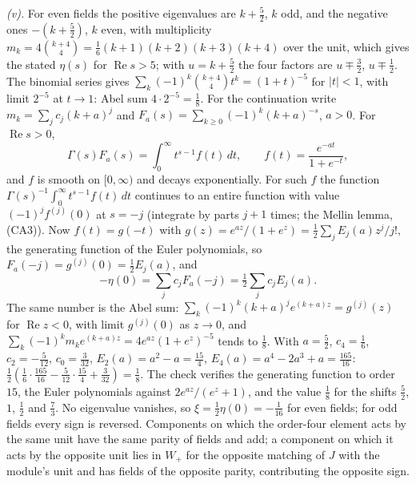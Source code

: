 \emph{(v).} For even fields the positive eigenvalues are $k + \tfrac52$, $k$ odd, and the negative ones $-(k + \tfrac52)$, $k$ even, with multiplicity $m_{k} = 4\binom{k+4}{4} = \tfrac16(k+1)(k+2)(k+3)(k+4)$ over the unit, which gives the stated $\eta(s)$ for $\operatorname{Re}s > 5$; with $u = k + \tfrac52$ the four factors are $u \mp \tfrac32$, $u \mp \tfrac12$. The binomial series gives $\sum_{k}(-1)^{k}\binom{k+4}{4}t^{k} = (1 + t)^{-5}$ for $|t| < 1$, with limit $2^{-5}$ at $t \to 1$: Abel sum $4 \cdot 2^{-5} = \tfrac18$. For the continuation write $m_{k} = \sum_{j}c_{j}(k + a)^{j}$ and $F_{a}(s) = \sum_{k \ge 0}(-1)^{k}(k + a)^{-s}$, $a > 0$. For $\operatorname{Re}s > 0$,
\[
\Gamma(s)F_{a}(s) = \int_{0}^{\infty}t^{s-1}f(t)\,dt, \qquad f(t) = \frac{e^{-at}}{1 + e^{-t}},
\]
and $f$ is smooth on $[0, \infty)$ and decays exponentially. For such $f$ the function $\Gamma(s)^{-1}\int_{0}^{\infty}t^{s-1}f(t)\,dt$ continues to an entire function with value $(-1)^{j}f^{(j)}(0)$ at $s = -j$ (integrate by parts $j + 1$ times; the Mellin lemma, (CA3)). Now $f(t) = g(-t)$ with $g(z) = e^{az}/(1 + e^{z}) = \tfrac12\sum_{j}E_{j}(a)z^{j}/j!$, the generating function of the Euler polynomials, so $F_{a}(-j) = g^{(j)}(0) = \tfrac12E_{j}(a)$, and
\[
-\eta(0) = \sum_{j}c_{j}F_{a}(-j) = \tfrac12\sum_{j}c_{j}E_{j}(a) .
\]
The same number is the Abel sum: $\sum_{k}(-1)^{k}(k + a)^{j}e^{(k + a)z} = g^{(j)}(z)$ for $\operatorname{Re}z < 0$, with limit $g^{(j)}(0)$ as $z \to 0$, and $\sum_{k}(-1)^{k}m_{k}e^{(k+a)z} = 4e^{az}(1 + e^{z})^{-5}$ tends to $\tfrac18$. With $a = \tfrac52$, $c_{4} = \tfrac16$, $c_{2} = -\tfrac5{12}$, $c_{0} = \tfrac3{32}$, $E_{2}(a) = a^{2} - a = \tfrac{15}{4}$, $E_{4}(a) = a^{4} - 2a^{3} + a = \tfrac{165}{16}$: $\tfrac12(\tfrac16 \cdot \tfrac{165}{16} - \tfrac5{12} \cdot \tfrac{15}{4} + \tfrac3{32}) = \tfrac18$. The check verifies the generating function to order $15$, the Euler polynomials against $2e^{az}/(e^{z} + 1)$, and the value $\tfrac18$ for the shifts $\tfrac52$, $1$, $\tfrac12$ and $\tfrac73$. No eigenvalue vanishes, so $\xi = \tfrac12\eta(0) = -\tfrac1{16}$ for even fields; for odd fields every sign is reversed. Components on which the order-four element acts by the same unit have the same parity of fields and add; a component on which it acts by the opposite unit lies in $W_{+}$ for the opposite matching of $J$ with the module's unit and has fields of the opposite parity, contributing the opposite sign.

